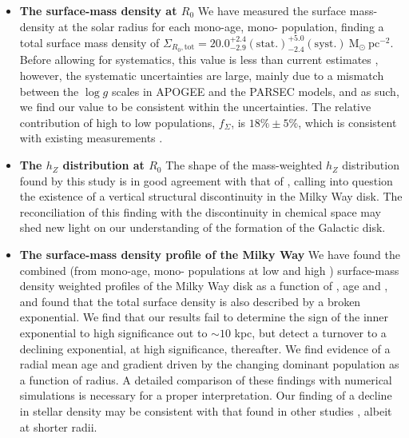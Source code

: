 \begin{itemize}
\item \textbf{The surface-mass density at $R_0$} We have measured the surface mass-density at the solar radius for each mono-age, mono-\feh{} population, finding a total surface mass density of  $\Sigma_{R_0, \text{tot}} = 20.0_{-2.9}^{+2.4}\mathrm{(stat.)}_{-2.4}^{+5.0}\mathrm{(syst.)}\ \mathrm{M_{\odot} \ pc^{-2}}$. Before allowing for systematics, this value is less than current estimates \citep[e.g.][]{2012ApJ...751..131B,2006MNRAS.372.1149F,2015ApJ...814...13M}, however, the systematic uncertainties are large, mainly due to a mismatch between the $\log{g}$ scales in APOGEE and the PARSEC models, and as such, we find our value to be consistent within the uncertainties. The relative contribution of high to low \afe{} populations, $f_\Sigma$, is $18\% \pm 5\%$, which is consistent with existing measurements \citep[e.g.][]{2016ARA&A..54..529B}. 
\item \textbf{The $h_Z$ distribution at $R_0$} The shape of the mass-weighted $h_Z$ distribution found by this study is in good agreement with that of \citet{2012ApJ...751..131B}, calling into question the existence of a vertical structural discontinuity in the Milky Way disk. The reconciliation of this finding with the discontinuity in chemical space \citep[e.g. the bimodality in \afe{} at fixed \feh{}:][]{2015ApJ...808..132H,2014ApJ...796...38N} may shed new light on our understanding of the formation of the Galactic disk.

\item \textbf{The surface-mass density profile of the Milky Way} We have found the combined (from mono-age, mono-\feh{} populations at low and high \afe{}) surface-mass density weighted profiles of the Milky Way disk as a function of \afe{}, age and \feh{}, and found that the total surface density is also described by a broken exponential. We find that our results fail to determine the sign of the inner exponential to high significance out to $\sim 10$ kpc, but detect a turnover to a declining exponential, at high significance, thereafter. We find evidence of a radial mean age and \feh{} gradient driven by the changing dominant population as a function of radius. A detailed comparison of these findings with numerical simulations is necessary for a proper interpretation. Our finding of a decline in stellar density may be consistent with that found in other studies \citep[e.g.][]{2009A&A...495..819R,2010MNRAS.402..713S}, albeit at shorter radii.
\end{itemize}

